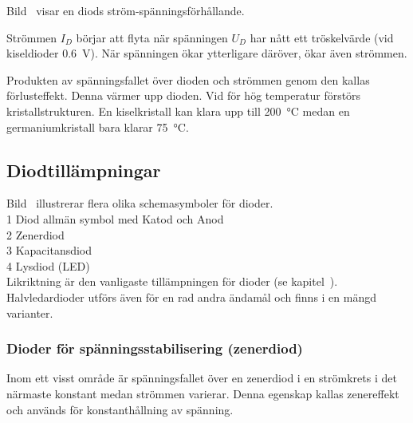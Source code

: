 Bild~ visar en diods ström-spänningsförhållande.

Strömmen \(I_D\) börjar att flyta när spänningen \(U_D\) har nått ett
tröskelvärde (vid kiseldioder \qty{0,6}{\volt}).
När spänningen ökar ytterligare däröver, ökar även strömmen.

Produkten av spänningsfallet över dioden och strömmen genom den kallas
förlusteffekt. Denna värmer upp dioden. Vid för hög temperatur förstörs
kristallstrukturen.
En kiselkristall kan klara upp till \qty{200}{\degreeCelsius} medan en
germaniumkristall bara klarar \qty{75}{\degreeCelsius}.\\


\newpage
\subsection{Diodtillämpningar}

Bild~ illustrerar flera olika schemasymboler för dioder.\\
1 Diod allmän symbol med Katod och Anod\\
2 Zenerdiod\\
3 Kapacitansdiod\\
4 Lysdiod (LED)\\

Likriktning är den vanligaste tillämpningen för dioder (se
kapitel~).
Halvledardioder utförs även för en rad andra ändamål och finns i en mängd
varianter.

\subsubsection{Dioder för spänningsstabilisering (zenerdiod)}
\label{diod_zener}

  Inom ett visst område är spänningsfallet över en zenerdiod i en strömkrets
  i det närmaste konstant medan strömmen varierar. Denna egenskap kallas
  zenereffekt och används för konstanthållning av spänning.

